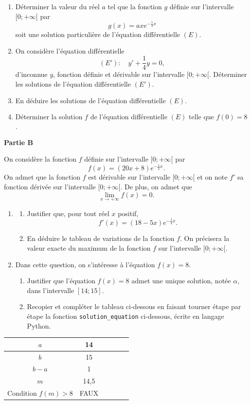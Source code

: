 \documentclass[11pt,a4paper]{article}
\renewcommand{\arraystretch}{1.12}
\newcounter{question}
\begin{document}
\begin{enumerate}
  \item Déterminer la valeur du réel $a$ tel que la fonction $g$ définie sur l'intervalle $[0;+\infty[$ par
  \[
g(x)=axe^{-\frac14 x}
  \]
  soit une solution particulière de l'équation différentielle $(E)$.
  \item On considère l'équation différentielle
  \[
  (E'):\quad y'+\dfrac14 y=0,
  \]
  d'inconnue $y$, fonction définie et dérivable sur l'intervalle $[0;+\infty[$. Déterminer les solutions de l'équation différentielle $(E')$.
  \item En déduire les solutions de l'équation différentielle $(E)$.
  \item Déterminer la solution $f$ de l'équation différentielle $(E)$ telle que $f(0)=8$.
\end{enumerate}

\textbf{Partie B}

On considère la fonction $f$ définie sur l'intervalle $[0;+\infty[$ par
\[
f(x)=(20x+8)e^{-\frac14 x}.
\]
On admet que la fonction $f$ est dérivable sur l'intervalle $[0;+\infty[$ et on note $f'$ sa fonction dérivée sur l'intervalle $[0;+\infty[$. De plus, on admet que
\[
\lim_{x\to+\infty} f(x)=0.
\]

\begin{enumerate}
  \item
  \begin{enumerate}
    \item Justifier que, pour tout réel $x$ positif,
    \[
f'(x)=(18-5x)e^{-\frac14 x}.
    \]
    \item En déduire le tableau de variations de la fonction $f$. On précisera la valeur exacte du maximum de la fonction $f$ sur l'intervalle $[0;+\infty[$.
  \end{enumerate}
  \item Dans cette question, on s'intéresse à l'équation $f(x)=8$.
  \begin{enumerate}
    \item Justifier que l'équation $f(x)=8$ admet une unique solution, notée $\alpha$, dans l'intervalle $[14;15]$.
    \item Recopier et compléter le tableau ci-dessous en faisant tourner étape par étape la fonction \texttt{solution\_equation} ci-dessous, écrite en langage Python.
  \end{enumerate}
\end{enumerate}

\begin{center}
\renewcommand{\arraystretch}{1.25}
\begin{tabular}{|c|c|c|c|c|c|}
\hline
$a$ & 14 & & & & \\ \hline
$b$ & 15 & & & & \\ \hline
$b-a$ & 1 & & & & \\ \hline
$m$ & 14,5 & & & & \\ \hline
Condition $f(m)>8$ & FAUX & & & & \\ \hline
\end{tabular}
\end{center}
\end{document}
